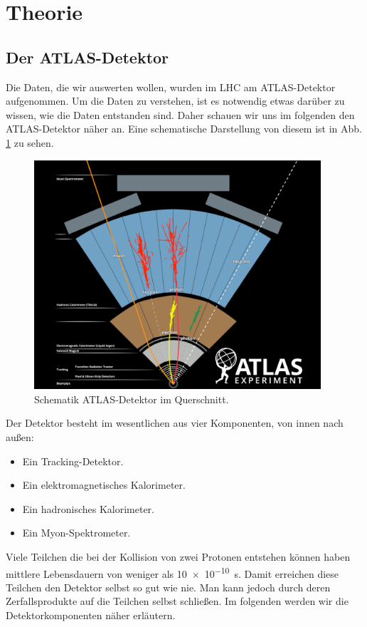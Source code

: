 \section{Theorie}

\subsection{Der ATLAS-Detektor}
Die Daten, die wir auswerten wollen, wurden im LHC am ATLAS-Detektor aufgenommen.
Um die Daten zu verstehen, ist es notwendig etwas darüber zu wissen, wie die Daten entstanden sind.
Daher schauen wir uns im folgenden den ATLAS-Detektor näher an.
Eine schematische Darstellung von diesem ist in Abb. \ref{ATLAS_schema_label} zu sehen.
\begin{figure}[ht]
	\centering
  \includegraphics[width=0.95\textwidth]{../Pictures/ATLAS_Detector_Schematic_black_(PNG).png}
	\caption{Schematik ATLAS-Detektor im Querschnitt. \cite{ATLAS_schema}}
	\label{ATLAS_schema_label}
\end{figure}
Der Detektor besteht im wesentlichen aus vier Komponenten, von innen nach außen:
\begin{itemize}
  \item Ein Tracking-Detektor.
  \item Ein elektromagnetisches Kalorimeter.
  \item Ein hadronisches Kalorimeter.
  \item Ein Myon-Spektrometer.
\end{itemize}
Viele Teilchen die bei der Kollision von zwei Protonen entstehen können haben mittlere Lebensdauern von weniger als \SI{10e-10}{\second}.
Damit erreichen diese Teilchen den Detektor selbst so gut wie nie.
Man kann jedoch durch deren Zerfallsprodukte auf die Teilchen selbst schließen.
Im folgenden werden wir die Detektorkomponenten näher erläutern.

